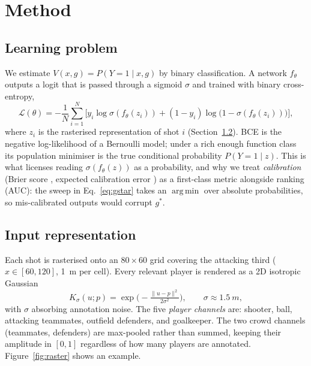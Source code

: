 \documentclass[11pt,a4paper]{article}
\newcommand{\gopt}{g^{*}}
\newcommand{\V}{V}
\newcommand{\argmin}{\operatorname*{arg\,min}}
\begin{document}
\section{Method}
\label{sec:method}

\subsection{Learning problem}
We estimate $\V(x,g)=P(Y=1\mid x,g)$ by binary classification. A network
$f_\theta$ outputs a logit that is passed through a sigmoid $\sigma$ and trained
with binary cross-entropy,
\begin{equation}
  \mathcal{L}(\theta) = -\frac{1}{N}\sum_{i=1}^{N}
    \Big[ y_i \log \sigma(f_\theta(z_i)) + (1-y_i)\log\big(1-\sigma(f_\theta(z_i))\big)\Big],
  \label{eq:bce}
\end{equation}
where $z_i$ is the rasterised representation of shot $i$
(Section~\ref{sec:raster}). BCE is the negative log-likelihood of a Bernoulli
model; under a rich enough function class its population minimiser is the true
conditional probability $P(Y=1\mid z)$. This is what licenses reading
$\sigma(f_\theta(z))$ as a probability, and why we treat \emph{calibration}
(Brier score \citep{brier1950verification}, expected calibration error
\citep{guo2017calibration}) as a first-class metric alongside ranking (AUC): the
sweep in Eq.~\eqref{eq:gstar} takes an $\argmin$ over absolute probabilities, so
mis-calibrated outputs would corrupt $\gopt$.

\subsection{Input representation}
\label{sec:raster}
Each shot is rasterised onto an $80\times 60$ grid covering the attacking third
($x\in[60,120]$, \SI{1}{m} per cell). Every relevant player is rendered as a 2D
isotropic Gaussian
\begin{equation}
  K_\sigma(u;p) = \exp\!\Big(-\tfrac{\lVert u-p\rVert^2}{2\sigma^2}\Big),
  \qquad \sigma\approx\SI{1.5}{m},
\end{equation}
with $\sigma$ absorbing annotation noise. The five \emph{player channels} are:
shooter, ball, attacking teammates, outfield defenders, and goalkeeper. The two
crowd channels (teammates, defenders) are max-pooled rather than summed, keeping
their amplitude in $[0,1]$ regardless of how many players are annotated.
Figure~\ref{fig:raster} shows an example.
\end{document}
